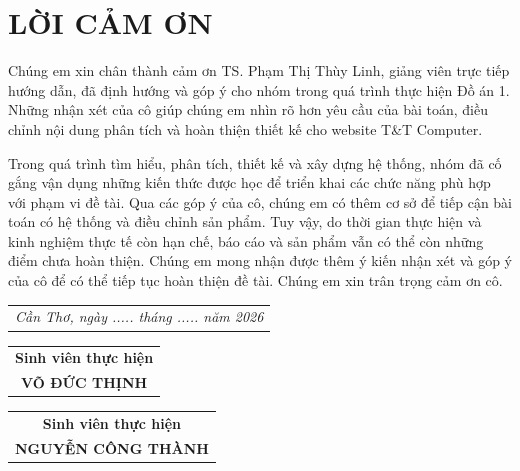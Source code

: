 \chapter*{LỜI CẢM ƠN}
\vspace{-15pt} 

Chúng em xin chân thành cảm ơn TS. Phạm Thị Thùy Linh, giảng viên trực tiếp hướng dẫn, đã định hướng và góp ý cho nhóm trong quá trình thực hiện Đồ án 1. Những nhận xét của cô giúp chúng em nhìn rõ hơn yêu cầu của bài toán, điều chỉnh nội dung phân tích và hoàn thiện thiết kế cho website T\&T Computer.

Trong quá trình tìm hiểu, phân tích, thiết kế và xây dựng hệ thống, nhóm đã cố gắng vận dụng những kiến thức được học để triển khai các chức năng phù hợp với phạm vi đề tài. Qua các góp ý của cô, chúng em có thêm cơ sở để tiếp cận bài toán có hệ thống và điều chỉnh sản phẩm. Tuy vậy, do thời gian thực hiện và kinh nghiệm thực tế còn hạn chế, báo cáo và sản phẩm vẫn có thể còn những điểm chưa hoàn thiện. Chúng em mong nhận được thêm ý kiến nhận xét và góp ý của cô để có thể tiếp tục hoàn thiện đề tài. Chúng em xin trân trọng cảm ơn cô.

\vfill 

\noindent\hfill
\begin{tabular}{@{}c@{}}
    \textit{Cần Thơ, ngày ..... tháng ..... năm 2026}
\end{tabular}

\vspace{0.2cm}

\noindent
\begin{tabular}{@{}c@{}}
    \textbf{Sinh viên thực hiện} \\[2cm]
    \textbf{VÕ ĐỨC THỊNH}
\end{tabular}
\hfill
\begin{tabular}{@{}c@{}}
    \textbf{Sinh viên thực hiện} \\[2cm]
    \textbf{NGUYỄN CÔNG THÀNH}
\end{tabular}
